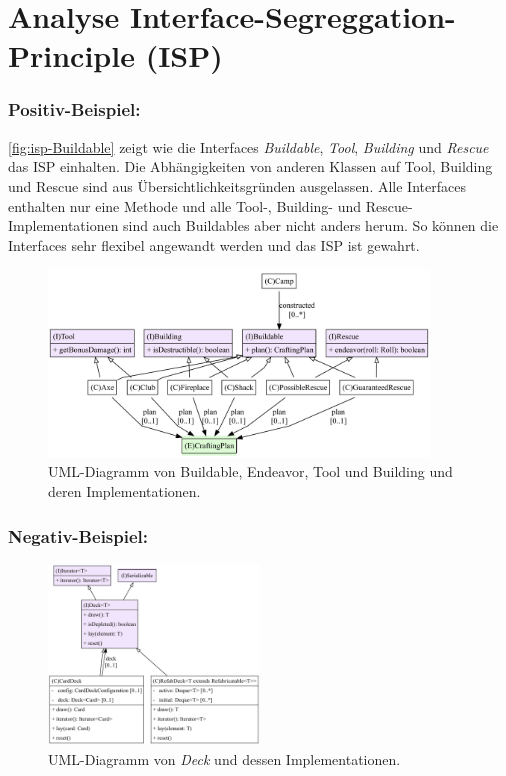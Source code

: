 \section{Analyse Interface-Segreggation-Principle (ISP)}

\subsubsection{Positiv-Beispiel:} 

\autoref{fig:isp-Buildable} zeigt wie die Interfaces \textit{Buildable}, \textit{Tool}, \textit{Building} und \textit{Rescue} 
das ISP einhalten. Die Abhängigkeiten von anderen Klassen auf Tool, Building und Rescue sind aus Übersichtlichkeitsgründen ausgelassen.
Alle Interfaces enthalten nur eine Methode und alle Tool-, Building- und Rescue-Implementationen sind auch Buildables 
aber nicht anders herum. So können die Interfaces sehr flexibel angewandt werden und das ISP ist gewahrt. 

\begin{figure}[H]
	\centering
	\includegraphics[width=0.9\textwidth]{Bilder/Buildable_structure.pdf} 
	\caption{UML-Diagramm von Buildable, Endeavor, Tool und Building und deren Implementationen.}
	\label{fig:isp-Buildable}
\end{figure} 

\subsubsection{Negativ-Beispiel:}

\begin{figure}[H]
	\centering
	\includegraphics[width=0.5\textwidth]{Bilder/Deck_structure.pdf} 
	\caption{UML-Diagramm von \textit{Deck} und dessen Implementationen.}
	\label{fig:isp-Deck}
\end{figure} 


